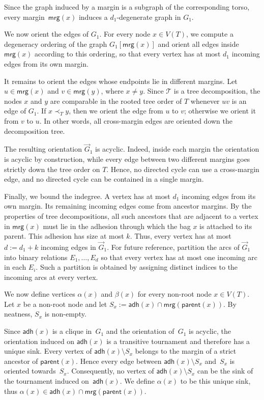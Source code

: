\documentclass[1p,number,11pt]{elsarticle}
\theoremstyle{plain}
\newcommand{\mrg}{\mathsf{mrg}}
\newcommand{\adh}{\mathsf{adh}}
\newcommand{\parent}{\mathsf{parent}}
\begin{document}
Since the graph induced by a margin is a subgraph of the corresponding torso,
every margin~$\mrg(x)$ induces a $d_1$-degenerate graph in $G_1$.

We now orient the edges of $G_1$.  For every node $x\in V(T)$, we compute a degeneracy ordering of the graph $G_1[\mrg(x)]$ and orient all edges inside $\mrg(x)$ according to this ordering, so that every vertex has at most $d_1$ incoming edges from its own margin.

It remains to orient the edges whose endpoints lie in different margins.
Let $u\in\mrg(x)$ and $v\in\mrg(y)$, where $x\neq y$.  
Since $\mathcal T$ is a tree decomposition, the nodes $x$ and $y$ are comparable in the rooted tree order of $T$ whenever $uv$ is an edge of $G_1$. 
If $x\prec_T y$, then we orient the edge from $u$ to $v$; otherwise we orient it from $v$ to $u$.  
In other words, all cross-margin edges are oriented down the decomposition tree.

The resulting orientation $\vec G_1$ is acyclic.  
Indeed, inside each margin the orientation is acyclic by construction, while every edge between two different margins goes strictly down the tree order on $T$.  
Hence, no directed cycle can use a cross-margin edge, and no directed cycle can be contained in a single margin.

Finally, we bound the indegree.  
A vertex has at most $d_1$ incoming edges from its own margin.  
Its remaining incoming edges come from ancestor margins.  
By the properties of tree decompositions, all such ancestors that are adjacent to a vertex in $\mrg(x)$ must lie in the adhesion through which the bag $x$ is attached to its parent.  
This adhesion has size at most $k$. 
Thus, every vertex has at most $d := d_1+k $ incoming edges in $\vec G_1$.
For future reference, partition the arcs of $\vec G_1$ into binary relations
$E_1,\ldots,E_d$ so that every vertex has at most one incoming arc in each
$E_i$.  Such a partition is obtained by assigning distinct indices to the
incoming arcs at every vertex.

We now define vertices $\alpha(x)$ and $\beta(x)$ for every non-root node
$x\in V(T)$. Let $x$ be a non-root node and let $S_x:=\adh(x)\cap\mrg(\parent(x))$.
By neatness, $S_x$ is non-empty.

Since $\adh(x)$ is a clique in~$G_1$ and the orientation of~$G_1$ is
acyclic, the orientation induced on $\adh(x)$ is a transitive tournament
and therefore has a unique sink. Every vertex of $\adh(x)\setminus S_x$
belongs to the margin of a strict ancestor of $\parent(x)$. Hence every
edge between $\adh(x)\setminus S_x$ and~$S_x$ is oriented towards~$S_x$.
Consequently, no vertex of $\adh(x)\setminus S_x$ can be the sink of the
tournament induced on~$\adh(x)$. We define $\alpha(x)$ to be this unique
sink, thus
$\alpha(x)\in\adh(x)\cap\mrg(\parent(x))$.
\end{document}
